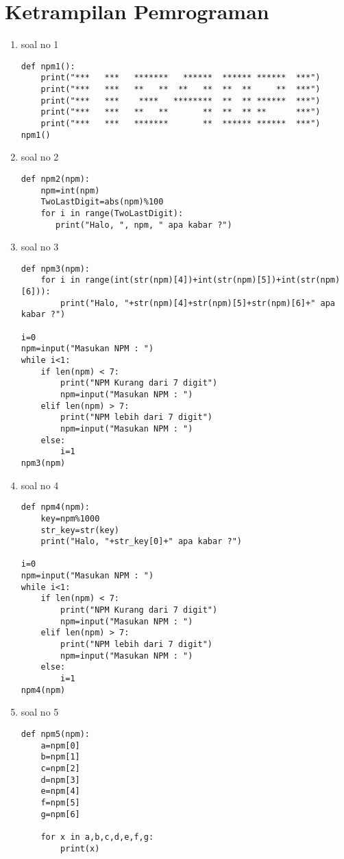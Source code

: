 \section{Ketrampilan Pemrograman}
\begin{enumerate}
\item soal no 1
\begin{lstlisting}
def npm1():
    print("***   ***   *******   ******  ****** ******  ***")
    print("***   ***   **   **  **   **  **  **     **  ***")
    print("***   ***    ****   ********  **  ** ******  ***")
    print("***   ***   **   **       **  **  ** **      ***")
    print("***   ***   *******       **  ****** ******  ***")
npm1()
\end{lstlisting}
\item soal no 2
\begin{lstlisting}
def npm2(npm):
    npm=int(npm)
    TwoLastDigit=abs(npm)%100
    for i in range(TwoLastDigit):
       print("Halo, ", npm, " apa kabar ?")
\end{lstlisting}
\item soal no 3
\begin{lstlisting}
def npm3(npm):
    for i in range(int(str(npm)[4])+int(str(npm)[5])+int(str(npm)[6])):
        print("Halo, "+str(npm)[4]+str(npm)[5]+str(npm)[6]+" apa kabar ?")

i=0
npm=input("Masukan NPM : ")
while i<1:
    if len(npm) < 7:
        print("NPM Kurang dari 7 digit")
        npm=input("Masukan NPM : ")
    elif len(npm) > 7:
        print("NPM lebih dari 7 digit")
        npm=input("Masukan NPM : ")
    else:
        i=1
npm3(npm)
\end{lstlisting}
\item soal no 4
\begin{lstlisting}
def npm4(npm):
    key=npm%1000
    str_key=str(key)
    print("Halo, "+str_key[0]+" apa kabar ?")

i=0
npm=input("Masukan NPM : ")
while i<1:
    if len(npm) < 7:
        print("NPM Kurang dari 7 digit")
        npm=input("Masukan NPM : ")
    elif len(npm) > 7:
        print("NPM lebih dari 7 digit")
        npm=input("Masukan NPM : ")
    else:
        i=1
npm4(npm)
\end{lstlisting}
\item soal no 5
\begin{lstlisting}
def npm5(npm):
    a=npm[0]
    b=npm[1]
    c=npm[2]
    d=npm[3]
    e=npm[4]
    f=npm[5]
    g=npm[6]

    for x in a,b,c,d,e,f,g:
        print(x)


\end{lstlisting}
\end{enumerate}
